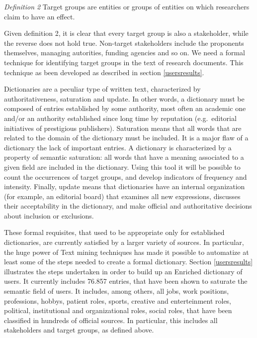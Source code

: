 \documentclass[]{book}
\begin{document}
\emph{Definition 2} Target groups are entities or groups of entities on
which researchers claim to have an effect.

Given definition 2, it is clear that every target group is also a
stakeholder, while the reverse does not hold true. Non-target
stakeholders include the proponents themselves, managing autorities,
funding agencies and so on. We need a formal technique for identifying
target groups in the text of research documents. This technique as been
developed as described in section \ref{usersresults}.

Dictionaries are a peculiar type of written text, characterized by
authoritativeness, saturation and update. In other words, a dictionary
must be composed of entries established by some authority, most often an
academic one and/or an authority established since long time by
reputation (e.g.~editorial initiatives of prestigious publishers).
Saturation means that all words that are related to the domain of the
dictionary must be included. It is a major flaw of a dictionary the lack
of important entries. A dictionary is characterized by a property of
semantic saturation: all words that have a meaning associated to a given
field are included in the dictionary. Using this tool it will be
possible to count the occurrences of target groups, and develop
indicators of frequency and intensity. Finally, update means that
dictionaries have an internal organization (for example, an editorial
board) that examines all new expressions, discusses their acceptability
in the dictionary, and make official and authoritative decisions about
inclusion or exclusions.

These formal requisites, that used to be appropriate only for
established dictionaries, are currently satisfied by a larger variety of
sources. In particular, the huge power of Text mining techniques has
made it possible to automatize at least some of the steps needed to
create a formal dictionary. Section \ref{usersresults} illustrates the
steps undertaken in order to build up an Enriched dictionary of users.
It currently includes 76.857 entries, that have been shown to saturate
the semantic field of users. It includes, among others, all jobs, work
positions, professions, hobbys, patient roles, sports, creative and
enterteinment roles, political, institutional and organizational roles,
social roles, that have been classified in hundreds of official sources.
In particular, this includes all stakeholders and target groups, as
defined above.
\end{document}
